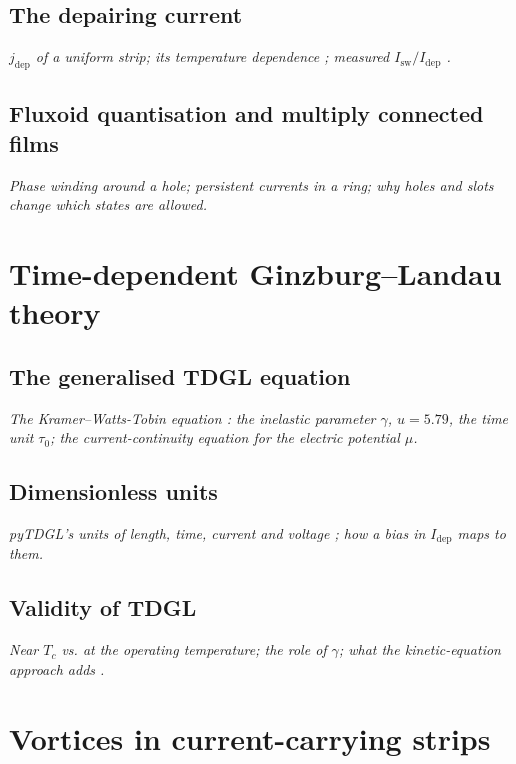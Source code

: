 \subsection{The depairing current}
\label{sec:th-depairing}
\emph{$j_\mathrm{dep}$ of a uniform strip; its temperature dependence \cite{sidorova2022}; measured $I_\mathrm{sw}/I_\mathrm{dep}$
\cite{frasca2019}.}

\subsection{Fluxoid quantisation and multiply connected films}
\label{sec:th-fluxoid}
\emph{Phase winding around a hole; persistent currents in a ring; why holes and slots change which states are
allowed.}

\section{Time-dependent Ginzburg--Landau theory}
\label{sec:th-tdgl}

\subsection{The generalised TDGL equation}
\label{sec:th-gtdgl}
\emph{The Kramer--Watts-Tobin equation \cite{kramer1978,wattstobin1981}: the inelastic parameter $\gamma$, $u = 5.79$,
the time unit $\tau_0$; the current-continuity equation for the electric potential $\mu$.}

\subsection{Dimensionless units}
\label{sec:th-units}
\emph{pyTDGL's units of length, time, current and voltage \cite{bishopvanhorn2023}; how a bias in $I_\mathrm{dep}$ maps to
them.}

\subsection{Validity of TDGL}
\label{sec:th-tdgl-validity}
\emph{Near $T_c$ vs. at the operating temperature; the role of $\gamma$; what the kinetic-equation approach adds
\cite{vodolazov2017,simon2025}.}

\section{Vortices in current-carrying strips}
\label{sec:th-vortices}

